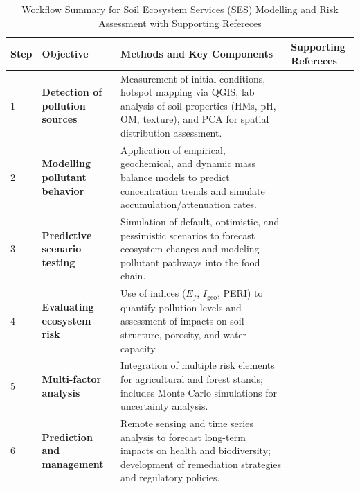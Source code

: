 \documentclass[sn-mathphys-num]{sn-jnl}
\begin{document}
\begin{table}[htbp]
\centering
\caption{Workflow Summary for Soil Ecosystem Services (SES) Modelling and Risk Assessment with Supporting Refereces}
\label{tab:ses_workflow_v2}
\begin{tabularx}{\textwidth}{|l|X|p{6.5cm}|X|}
\hline
\textbf{Step} & \textbf{Objective} & \textbf{Methods and Key Components} & \textbf{Supporting Refereces} \\ \hline
1 & \textbf{Detection of pollution sources} & Measurement of initial conditions, hotspot mapping via QGIS, lab analysis of soil properties (HMs, pH, OM, texture), and PCA for spatial distribution assessment. & \cite{Adewumi2024, ElSorogy2025, Feng2024, Lemenkova2021, Mukhopadhyay2020, Wan2019} \\ \hline
2 & \textbf{Modelling pollutant behavior} & Application of empirical, geochemical, and dynamic mass balance models to predict concentration trends and simulate accumulation/attenuation rates. & \cite{Giannakis2017, Koukianaki2025, LindhLemenkova2022b, Mohammad2025, PerezLucas2025, Xu2026} \\ \hline
3 & \textbf{Predictive scenario testing} & Simulation of default, optimistic, and pessimistic scenarios to forecast ecosystem changes and modeling pollutant pathways into the food chain. & \cite{Appel2022, GonzalezRodriguez2011, Hossini2025, Lemenkova2024a, Wang2025, Yasir2025} \\ \hline
4 & \textbf{Evaluating ecosystem risk} & Use of indices ($E_f$, $I_{\mathrm{geo}}$, PERI) to quantify pollution levels and assessment of impacts on soil structure, porosity, and water capacity. & \cite{AnsoarRodriguez2025, Chukwuonye2025, Egbueri2020, Ferreira2022, Kim2024, Li2025a} \\ \hline
5 & \textbf{Multi-factor analysis} & Integration of multiple risk elements for agricultural and forest stands; includes Monte Carlo simulations for uncertainty analysis. & \cite{Lemenkova2025c, Li2025a, Lu2020, Olah2025, Proshad2025, Wang2024b} \\ \hline
6 & \textbf{Prediction and management} & Remote sensing and time series analysis to forecast long-term impacts on health and biodiversity; development of remediation strategies and regulatory policies. & \cite{Fan2025, Lemenkova2025a, Lemenkova2025d, Pan2019, Stojic2019, Xu2025} \\ \hline
\end{tabularx}
\end{table}
\end{document}
